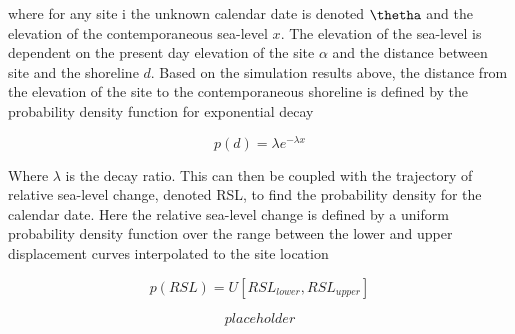 \documentclass[
]{article}
\begin{document}
where for any site i the unknown calendar date is denoted \(\thetha\) and the elevation of the contemporaneous sea-level \(x\). The elevation of the sea-level is dependent on the present day elevation of the site \(\alpha\) and the distance between site and the shoreline \(d\). Based on the simulation results above, the distance from the elevation of the site to the contemporaneous shoreline is defined by the probability density function for exponential decay

\begin{equation}
  p(d) = \lambda {e}^{- \lambda x}
  \label{eq:decay}
\end{equation}

Where \(\lambda\) is the decay ratio. This can then be coupled with the trajectory of relative sea-level change, denoted RSL, to find the probability density for the calendar date. Here the relative sea-level change is defined by a uniform probability density function over the range between the lower and upper displacement curves interpolated to the site location

\begin{equation}
p(RSL) = U[RSL_{lower}, RSL_{upper}]    
  \label{eq:rsl}
\end{equation}

\begin{equation} 
  placeholder
  \label{eq:shoredate}
\end{equation}
\end{document}
